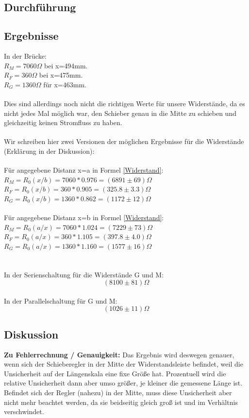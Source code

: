 \documentclass{article}
\begin{document}
\subsection{Durchführung}
\subsection{Ergebnisse}
In der Brücke:\\
$R_M=7060 \Omega$ bei x=494mm.\\ 
$R_F=360 \Omega$ bei x=475mm.\\
$R_G=1360 \Omega$ für x=463mm.\\
\\
Dies sind allerdings noch nicht die richtigen Werte für unsere Widerstände, da es nicht jedes Mal möglich war, den Schieber genau in die Mitte zu schieben und gleichzeitig keinen Stromfluss zu haben. \\
\\
Wir schreiben hier zwei Versionen der möglichen Ergebnisse für die Widerstände (Erklärung in der Diskussion): \\
\\
Für angegebene Distanz x=a in Formel \ref{Widerstand}:\\
$R_M=R_0 (x/b)=7060*0.976=(6891 \pm 69)\Omega$\\
$R_F=R_0 (x/b)=360*0.905=(325.8 \pm 3.3)\Omega$\\
$R_G=R_0 (x/b)=1360*0.862=(1172 \pm 12)\Omega$\\
\\
Für angegebene Distanz x=b in Formel \ref{Widerstand}:\\
$R_M=R_0 (a/x)=7060*1.024=(7229 \pm 73)\Omega$\\
$R_F=R_0 (a/x)=360*1.105=(397.8 \pm 4.0)\Omega$\\
$R_G=R_0 (a/x)=1360*1.160=(1577 \pm 16)\Omega$\\
\\
\\
In der Serienschaltung für die Widerstände G und M: 
$$(8100 \pm 81)\Omega$$\\
In der Parallelschaltung für G und M: 
$$(1026 \pm 11)\Omega$$


\subsection{Diskussion}
\textbf{Zu Fehlerrechnung / Genauigkeit:}
Das Ergebnis wird deswegen genauer, wenn sich der Schieberegler in der Mitte der Widerstandsleiste befindet, weil die Unsicherheit auf der Längenskala eine fixe Größe hat. Prozentuell wird die relative Unsicherheit dann aber umso größer, je kleiner die gemessene Länge ist. Befindet sich der Regler (nahezu) in der Mitte, muss diese Unsicherheit aber nicht mehr beachtet werden, da sie beidseitig gleich groß ist und im Verhältnis verschwindet.\\
\end{document}
